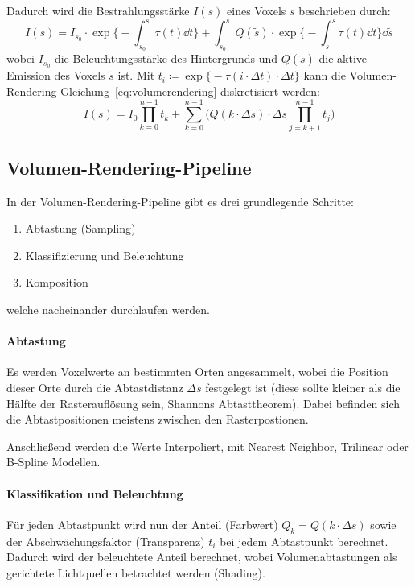 				Dadurch wird die Bestrahlungsstärke \( I(s) \) eines Voxels \(s\) beschrieben durch:
				\begin{equation}
					I(s) = I_{s_0} \cdot \exp \Bigg\{ -\int_{s_0}^{s} \! \tau(t) \dd{t} \Bigg\} + \int_{s_0}^{s} \! Q(\tilde{s}) \cdot \exp \Bigg\{ -\int_{\tilde{s}}^{s} \tau(t) \dd{t} \Bigg\} \dd{\tilde{s}}  \label{eq:volumerendering}
				\end{equation}
				wobei \( I_{s_0} \) die Beleuchtungsstärke des Hintergrunds und \( Q(\tilde{s}) \) die aktive Emission des Voxels \( \tilde{s} \) ist. Mit \( t_i \coloneqq \exp\Big\{ -\tau(i \cdot \Delta t) \cdot \Delta t \Big\} \) kann die Volumen-Rendering-Gleichung~\eqref{eq:volumerendering} diskretisiert werden:
				\begin{equation}
					I(s) = I_0 \prod_{k = 0}^{n - 1} t_k + \sum_{k = 0}^{n - 1} \Bigg( Q(k \cdot \Delta s) \cdot \Delta s \prod_{j = k + 1}^{n - 1} t_j \Bigg)  \label{eq:volumerenderingdiscrete}
				\end{equation}

			\subsection{Volumen-Rendering-Pipeline}
				In der Volumen-Rendering-Pipeline gibt es drei grundlegende Schritte:
				\begin{enumerate}
					\item Abtastung (Sampling)
					\item Klassifizierung und Beleuchtung
					\item Komposition
				\end{enumerate}
				welche nacheinander durchlaufen werden.

				\paragraph{Abtastung}
					Es werden Voxelwerte an bestimmten Orten angesammelt, wobei die Position dieser Orte durch die Abtastdistanz \( \Delta s \) festgelegt ist (diese sollte kleiner als die Hälfte der Rasterauflösung sein, Shannons Abtasttheorem). Dabei befinden sich die Abtastpositionen meistens zwischen den Rasterpostionen.

					Anschließend werden die Werte Interpoliert, \bspw mit Nearest Neighbor, Trilinear oder B-Spline Modellen.

				\paragraph{Klassifikation und Beleuchtung}
					Für jeden Abtastpunkt wird nun der Anteil (Farbwert) \( Q_k = Q(k \cdot \Delta s) \) sowie der Abschwächungsfaktor (Transparenz) \( t_i \) bei jedem Abtastpunkt berechnet. Dadurch wird der beleuchtete Anteil berechnet, wobei Volumenabtastungen als gerichtete Lichtquellen betrachtet werden (Shading).

